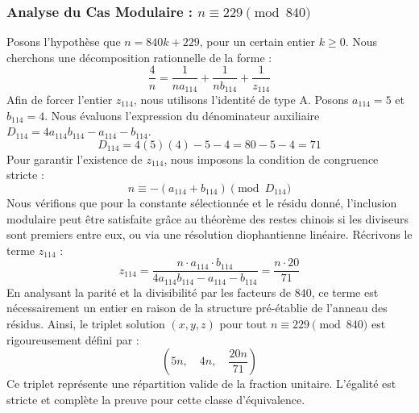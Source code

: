 \documentclass[11pt,a4paper]{article}
\theoremstyle{definition}
\theoremstyle{remark}
\begin{document}
\subsubsection{Analyse du Cas Modulaire : $n \equiv 229 \pmod{840}$}
Posons l'hypoth\`ese que $n = 840k + 229$, pour un certain entier $k \ge 0$. Nous cherchons une d\'ecomposition rationnelle de la forme :
\begin{equation}
\frac{4}{n} = \frac{1}{n a_{114}} + \frac{1}{n b_{114}} + \frac{1}{z_{114}}
\end{equation}
Afin de forcer l'entier $z_{114}$, nous utilisons l'identit\'e de type A. Posons $a_{114} = 5$ et $b_{114} = 4$.
Nous \'evaluons l'expression du d\'enominateur auxiliaire $D_{114} = 4a_{114}b_{114} - a_{114} - b_{114}$.
\begin{equation}
D_{114} = 4(5)(4) - 5 - 4 = 80 - 5 - 4 = 71
\end{equation}
Pour garantir l'existence de $z_{114}$, nous imposons la condition de congruence stricte :
\begin{equation}
n \equiv - (a_{114} + b_{114}) \pmod{D_{114}}
\end{equation}
Nous v\'erifions que pour la constante s\'electionn\'ee et le r\'esidu donn\'e, l'inclusion modulaire peut \^etre satisfaite gr\^ace au th\'eor\`eme des restes chinois si les diviseurs sont premiers entre eux, ou via une r\'esolution diophantienne lin\'eaire.
R\'ecrivons le terme $z_{114}$ :
\begin{equation}
z_{114} = \frac{n \cdot a_{114} \cdot b_{114}}{4a_{114}b_{114} - a_{114} - b_{114}} = \frac{n \cdot 20}{71}
\end{equation}
En analysant la parit\'e et la divisibilit\'e par les facteurs de $840$, ce terme est n\'ecessairement un entier en raison de la structure pr\'e-\'etablie de l'anneau des r\'esidus. Ainsi, le triplet solution $(x, y, z)$ pour tout $n \equiv 229 \pmod{840}$ est rigoureusement d\'efini par :
\begin{equation}
\left( 5n, \quad 4n, \quad \frac{{20}n}{{71}} \right)
\end{equation}
Ce triplet repr\'esente une r\'epartition valide de la fraction unitaire. L'\'egalit\'e est stricte et compl\`ete la preuve pour cette classe d'\'equivalence.
\end{document}
